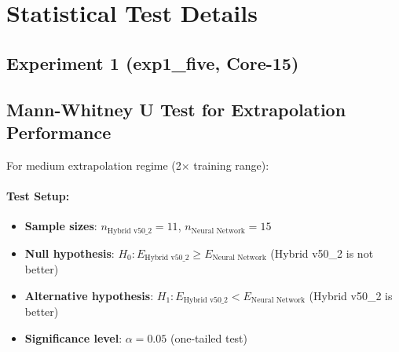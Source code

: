 \documentclass[twoside,11pt]{article}
\begin{document}

\section{Statistical Test Details}
\label{app:statistical_tests}

\subsection*{Experiment 1 (exp1\_five, Core-15)}

\subsection{Mann-Whitney U Test for Extrapolation Performance}

For medium extrapolation regime (2$\times$ training range):

\paragraph{Test Setup:}
\begin{itemize}
\item \textbf{Sample sizes}: $n_{\text{Hybrid v50\_2}} = 11$, $n_{\text{Neural Network}} = 15$
\item \textbf{Null hypothesis}: $H_0: E_{\text{Hybrid v50\_2}} \geq E_{\text{Neural Network}}$ (Hybrid v50\_2 is not better)
\item \textbf{Alternative hypothesis}: $H_1: E_{\text{Hybrid v50\_2}} < E_{\text{Neural Network}}$ (Hybrid v50\_2 is better)
\item \textbf{Significance level}: $\alpha = 0.05$ (one-tailed test)
\end{itemize}
\end{document}
